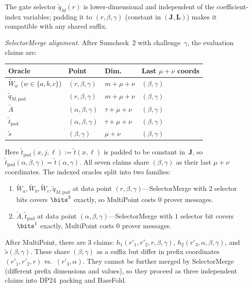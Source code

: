 The gate selector $\tilde{q}_M(r)$ is lower-dimensional and
independent of the coefficient-index variables;
padding it to $(r,\beta,\gamma)$ (constant in $(\bm{J},\bm{L})$)
makes it compatible with any shared suffix.

\emph{SelectorMerge alignment.}
After Sumcheck~2 with challenge~$\gamma$, the evaluation claims are:
\begin{center}
\begin{tabular}{llll}
    Oracle & Point & Dim. & Last $\mu{+}\nu$ coords \\
    \hline
    $\tilde{W}_w$ ($w \in \{a,b,c\}$) & $(r, \beta, \gamma)$ & $m + \mu + \nu$ & $(\beta, \gamma)$ \\
    $\tilde{q}_{M,\mathrm{pad}}$ & $(r, \beta, \gamma)$ & $m + \mu + \nu$ & $(\beta, \gamma)$ \\
    $\tilde{A}$ & $(\alpha, \beta, \gamma)$ & $\tau + \mu + \nu$ & $(\beta, \gamma)$ \\
    $\tilde{t}_{\mathrm{pad}}$ & $(\alpha, \beta, \gamma)$ & $\tau + \mu + \nu$ & $(\beta, \gamma)$ \\
    $\tilde{s}$ & $(\beta, \gamma)$ & $\mu + \nu$ & $(\beta, \gamma)$
\end{tabular}
\end{center}
Here $\tilde{t}_{\mathrm{pad}}(x,j,\ell) := \tilde{t}(x,\ell)$
is padded to be constant in~$\bm{J}$, so
$\tilde{t}_{\mathrm{pad}}(\alpha,\beta,\gamma) = \tilde{t}(\alpha,\gamma)$.
All seven claims share $(\beta,\gamma)$ as their last $\mu + \nu$
coordinates.  The indexed oracles split into two families:
\begin{enumerate}[nosep]
    \item $\tilde{W}_a, \tilde{W}_b, \tilde{W}_c, \tilde{q}_{M,\mathrm{pad}}$
          at data point $(r, \beta, \gamma)$---SelectorMerge with $2$
          selector bits covers $\bits^2$ exactly, so MultiPoint
          costs $0$ prover messages.
    \item $\tilde{A}, \tilde{t}_{\mathrm{pad}}$
          at data point $(\alpha, \beta, \gamma)$---SelectorMerge
          with $1$ selector bit covers $\bits^1$ exactly,
          MultiPoint costs $0$ prover messages.
\end{enumerate}
After MultiPoint, there are $3$ claims: $h_1(r'_1, r'_2, r, \beta, \gamma)$,
$h_2(r'_3, \alpha, \beta, \gamma)$, and $\tilde{s}(\beta, \gamma)$.
These share $(\beta,\gamma)$ as a suffix but differ in prefix
coordinates $(r'_1, r'_2, r)$ vs.\ $(r'_3, \alpha)$.
They cannot be further merged by SelectorMerge (different prefix
dimensions and values), so they proceed as three independent claims
into DP24~packing and BaseFold.

